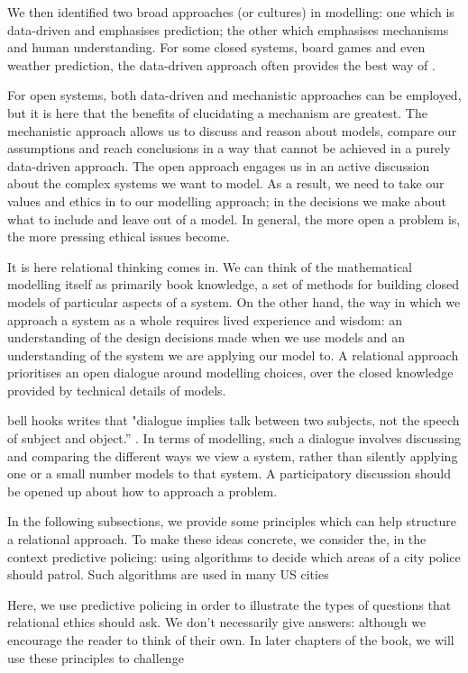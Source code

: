 We then identified two broad approaches (or cultures) in modelling: one which is data-driven and emphasises prediction; the other which emphasises mechanisms and human understanding. For some closed systems, board games and even weather prediction, the data-driven approach often provides the best way of .

For open systems, both data-driven and mechanistic approaches can be employed, but it is here that the benefits of elucidating a mechanism are greatest. The mechanistic approach allows us to discuss and reason about models, compare our assumptions and reach conclusions in a way that cannot be achieved in a purely data-driven approach. The open approach engages us in an active discussion about the complex systems we want to model. As a result, we need to take our values and ethics in to our modelling approach; in the decisions we make about what to include and leave out of a model. In general, the more open a problem is, the more pressing ethical issues become.

It is here relational thinking comes in. We can think of the mathematical modelling itself as primarily book knowledge, a set of methods for building closed models of particular aspects of a system. On the other hand, the way in which we approach a system as a whole requires lived experience and wisdom: an understanding of the design decisions made when we use models and an understanding of the system we are applying our model to. A relational approach prioritises an open dialogue around modelling choices, over the closed knowledge provided by technical details of models.

bell hooks writes that "dialogue implies talk between two subjects, not the speech of subject and object.” \cite{hooks1989talking}. In terms of modelling, such a dialogue involves discussing and comparing the different ways we view a system, rather than silently applying one or a small number models to that system. A participatory discussion should be opened up about how to approach a problem. 

In the following subsections, we provide some principles which can help structure a relational approach. To make these ideas concrete, we consider the, in the context predictive policing: using algorithms to decide which areas of a city police should patrol. Such algorithms are used in many US cities 



 Here, we use predictive policing in order to illustrate the types of questions that relational ethics should ask. We don't necessarily give answers: although we encourage the reader to think of their own. In later chapters of the book, we will use these principles to challenge 

